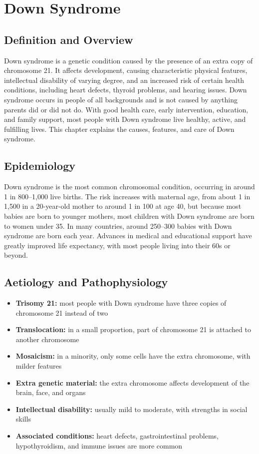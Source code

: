 \chapter{Down Syndrome}

\section*{Definition and Overview}
Down syndrome is a genetic condition caused by the presence of an extra copy of chromosome 21. It affects development, causing characteristic physical features, intellectual disability of varying degree, and an increased risk of certain health conditions, including heart defects, thyroid problems, and hearing issues. Down syndrome occurs in people of all backgrounds and is not caused by anything parents did or did not do. With good health care, early intervention, education, and family support, most people with Down syndrome live healthy, active, and fulfilling lives. This chapter explains the causes, features, and care of Down syndrome.

\section*{Epidemiology}
Down syndrome is the most common chromosomal condition, occurring in around 1 in 800--1,000 live births. The risk increases with maternal age, from about 1 in 1,500 in a 20-year-old mother to around 1 in 100 at age 40, but because most babies are born to younger mothers, most children with Down syndrome are born to women under 35. In many countries, around 250--300 babies with Down syndrome are born each year. Advances in medical and educational support have greatly improved life expectancy, with most people living into their 60s or beyond.

\section*{Aetiology and Pathophysiology}
\begin{itemize}
    \item \textbf{Trisomy 21:} most people with Down syndrome have three copies of chromosome 21 instead of two
    \item \textbf{Translocation:} in a small proportion, part of chromosome 21 is attached to another chromosome
    \item \textbf{Mosaicism:} in a minority, only some cells have the extra chromosome, with milder features
    \item \textbf{Extra genetic material:} the extra chromosome affects development of the brain, face, and organs
    \item \textbf{Intellectual disability:} usually mild to moderate, with strengths in social skills
    \item \textbf{Associated conditions:} heart defects, gastrointestinal problems, hypothyroidism, and immune issues are more common
\end{itemize}


